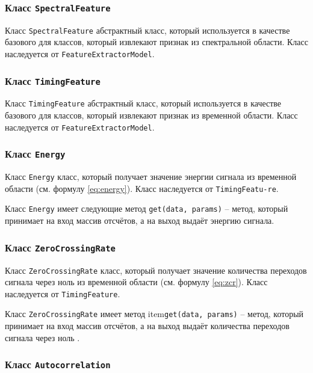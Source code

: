 \subsubsection{Класс \texttt{SpectralFeature}}

Класс \texttt{SpectralFeature} абстрактный класс, который используется в качестве базового для классов, который извлекают признак из спектральной области. Класс наследуется от \texttt{FeatureExtractorModel}.

\subsubsection{Класс \texttt{TimingFeature}}

Класс \texttt{TimingFeature} абстрактный класс, который используется в качестве базового для классов, который извлекают признак из временной области. Класс наследуется от \texttt{FeatureExtractorModel}.


\subsubsection{Класс \texttt{Energy}}

Класс \texttt{Energy} класс, который получает значение энергии сигнала из временной области (см. формулу \ref{eq:energy}). Класс наследуется от \texttt{TimingFeatu-}\texttt{re}.

Класс \texttt{Energy} имеет следующие метод \texttt{get(data, params)} --  метод, который принимает на вход массив отсчётов, а на выход выдаёт энергию сигнала. 



\subsubsection{Класс \texttt{ZeroCrossingRate}}

Класс \texttt{ZeroCrossingRate} класс, который получает значение количества переходов сигнала через ноль из временной области (см. формулу \ref{eq:zcr}). Класс наследуется от \texttt{TimingFeature}.

Класс \texttt{ZeroCrossingRate} имеет метод item{\texttt{get(data, params)} --  метод, который принимает на вход массив отсчётов, а на выход выдаёт количества переходов сигнала через ноль . }


\subsubsection{Класс \texttt{Autocorrelation}}

